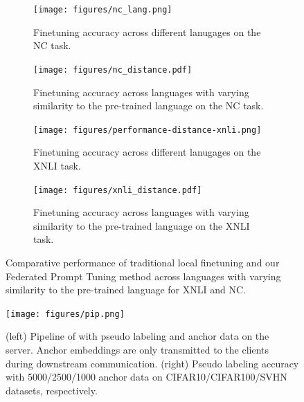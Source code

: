 \documentclass[withindex,glossary]{cam-thesis}
\begin{document}
\begin{figure}[h]
    \centering
    \vspace{-0.3cm}%
    \begin{subfigure}{0.49\textwidth}
        \centering
        \texttt{[image: figures/nc\_lang.png]}
        \vspace{-0.1cm}
        \caption{Finetuning accuracy across different lanugages on the NC task. }
    \end{subfigure}
    \hfill
    \begin{subfigure}{0.49\textwidth}
        \centering
        \texttt{[image: figures/nc\_distance.pdf]}
        \vspace{-0.1cm}
        \caption{Finetuning accuracy across languages with varying similarity to the pre-trained language on the NC task. }
    \end{subfigure}
    \hfill
    \begin{subfigure}{0.49\textwidth}
        \centering
        \texttt{[image: figures/performance-distance-xnli.png]}
        \vspace{-0.1cm}
        \caption{Finetuning accuracy across different lanugages on the XNLI task. }
    \end{subfigure}
    \hfill
    \begin{subfigure}{0.49\textwidth}
        \centering
        \texttt{[image: figures/xnli\_distance.pdf]}
        \vspace{-0.1cm}
        \caption{Finetuning accuracy across languages with varying similarity to the pre-trained language on the XNLI task. }
    \end{subfigure}
    \caption{Comparative performance of traditional local finetuning and our Federated Prompt Tuning method across languages with varying similarity to the pre-trained language for XNLI and NC. }
    \vspace{-0.5cm}%
    \label{fig:combined}
\end{figure}

\begin{figure}[t]
\centering
    \texttt{[image: figures/pip.png]}
\caption{\small (left) Pipeline of \method with pseudo labeling and anchor data on the server. Anchor embeddings are only transmitted to the clients during downstream communication. (right) Pseudo labeling accuracy with 5000/2500/1000 anchor data on CIFAR10/CIFAR100/SVHN datasets, respectively.}
\label{fig:pip}
\vspace{-5mm}
\end{figure}
\end{document}
